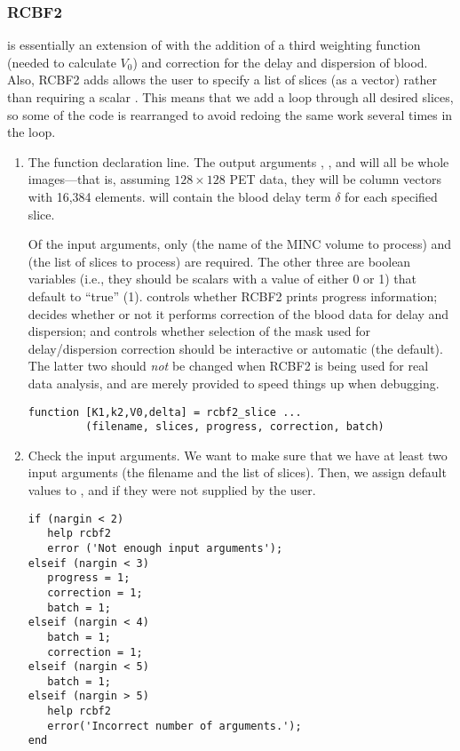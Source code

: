\subsubsection{RCBF2}
\label{sec:rcbf2_listing}

 is essentially an extension of  with the
addition of a third weighting function (needed to calculate $V_0$) and
correction for the delay and dispersion of blood.  Also, RCBF2 adds
allows the user to specify a list of slices (as a vector) rather than
requiring a scalar .  This means that we add a loop
through all desired slices, so some of the code is rearranged to avoid
redoing the same work several times in the loop.

\begin{enumerate}
\item The function declaration line.  The output arguments ,
  , and  will all be whole images---that is,
  assuming $128 \times 128$ PET data, they will be column vectors with
  16,384 elements.   will contain the blood delay term
  $\delta$ for each specified slice.

  Of the input arguments, only  (the name of the MINC
  volume to process) and  (the list of slices to process)
  are required.  The other three are boolean variables (i.e., they
  should be scalars with a value of either 0 or 1) that default to
  ``true'' (1).   controls whether RCBF2 prints
  progress information;  decides whether or not it
  performs correction of the blood data for delay and dispersion; and
   controls whether selection of the mask used for
  delay/dispersion correction should be interactive or automatic (the
  default).  The latter two should {\em not} be changed when RCBF2 is
  being used for real data analysis, and are merely provided to speed
  things up when debugging.
  \begin{verbatim}
function [K1,k2,V0,delta] = rcbf2_slice ...
         (filename, slices, progress, correction, batch)
  \end{verbatim}

\item Check the input arguments.  We want to make sure that we have at
  least two input arguments (the filename and the list of slices).
  Then, we assign default values to , 
  and  if they were not supplied by the user.
\begin{verbatim}
if (nargin < 2)
   help rcbf2
   error ('Not enough input arguments');
elseif (nargin < 3)
   progress = 1;
   correction = 1;
   batch = 1;   
elseif (nargin < 4)
   batch = 1;
   correction = 1;
elseif (nargin < 5)
   batch = 1;
elseif (nargin > 5)
   help rcbf2
   error('Incorrect number of arguments.');
end
\end{verbatim}


\end{enumerate}
